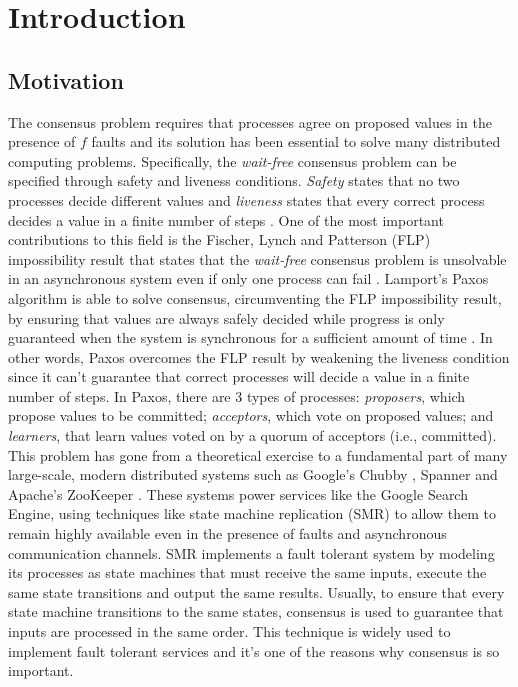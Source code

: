 \documentclass[runningheads,a4paper]{llncs}
\begin{document}
\newpage
\tableofcontents
\newpage

\section{Introduction}
\subsection{Motivation}
The consensus problem requires that processes agree on proposed values in the presence of $f$ faults and its solution has been essential to solve many distributed computing problems. Specifically, the \textit{wait-free} consensus problem can be specified through safety and liveness conditions. 
\textit{Safety} states that no two processes decide different values and \textit{liveness} states that every correct process decides a value in a finite number of steps \cite{Herlihy1991}. One of the most important contributions to this field is the Fischer, Lynch and Patterson (FLP) impossibility result that states that the \textit{wait-free} consensus problem is unsolvable in an asynchronous system even if only one process can fail \cite{Fischer1985}. Lamport's Paxos algorithm is able to solve consensus, circumventing the FLP impossibility result, by ensuring that values are always safely decided while progress is only guaranteed when the system is synchronous for a sufficient amount of time \cite{Lamport2001}. In other words, Paxos overcomes the FLP result by weakening the liveness condition since it can't guarantee that correct processes will decide a value in a finite number of steps. In Paxos, there are 3 types of processes: \textit{proposers}, which propose values to be committed; \textit{acceptors}, which vote on proposed values; and \textit{learners}, that learn values voted on by a quorum of acceptors (i.e., committed). This problem has gone from a theoretical exercise to a fundamental part of many large-scale, modern distributed systems such as Google's Chubby \cite{Burrows2006}, Spanner \cite{Corbett2012} and Apache's ZooKeeper \cite{Junqueira2011}. These systems power services like the Google Search Engine, using techniques like state machine replication (SMR) to allow them to remain highly available even in the presence of faults and asynchronous communication channels. SMR implements a fault tolerant system by modeling its processes as state machines that must receive the same inputs, execute the same state transitions and output the same results. Usually, to ensure that every state machine transitions to the same states, consensus is used to guarantee that inputs are processed in the same order. This technique is widely used to implement fault tolerant services and it's one of the reasons why consensus is so important.\par
\end{document}
